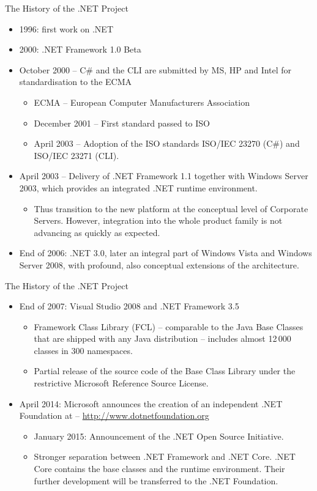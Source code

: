 \documentclass{beamer}
\begin{document}
\begin{frame}{The History of the .NET Project}
\begin{itemize}
\item 1996: first work on .NET
\item 2000: .NET Framework 1.0 Beta
\item October 2000 -- C\# and the CLI are submitted by MS, HP and Intel for
  standardisation to the ECMA
  \begin{itemize}
  \item ECMA -- European Computer Manufacturers Association
  \item December 2001 -- First standard passed to ISO
  \item April 2003 -- Adoption of the ISO standards ISO/IEC 23270 (C\#) and
    ISO/IEC 23271 (CLI).
  \end{itemize}
\item April 2003 -- Delivery of .NET Framework 1.1 together with Windows
  Server 2003, which provides an integrated .NET runtime environment.
  \begin{itemize}
  \item Thus transition to the new platform at the conceptual level of
    Corporate Servers. However, integration into the whole product family is
    not advancing as quickly as expected.
  \end{itemize}
\item End of 2006: .NET 3.0, later an integral part of Windows Vista and
  Windows Server 2008, with profound, also conceptual extensions of the
  architecture.
\end{itemize}
\end{frame}

\begin{frame}{The History of the .NET Project}
\begin{itemize}
\item End of 2007: Visual Studio 2008 and .NET Framework 3.5
  \begin{itemize}
  \item Framework Class Library (FCL) -- comparable to the Java Base Classes
    that are shipped with any Java distribution -- includes almost 12\,000
    classes in 300 namespaces.
  \item Partial release of the source code of the Base Class Library under the
    restrictive Microsoft Reference Source License.
  \end{itemize}
\item April 2014: Microsoft announces the creation of an independent .NET
  Foundation at -- \url{http://www.dotnetfoundation.org}
  \begin{itemize}
  \item January 2015: Announcement of the .NET Open Source Initiative.
  \item Stronger separation between .NET Framework and .NET Core. .NET Core
    contains the base classes and the runtime environment. Their further
    development will be transferred to the .NET Foundation.
  \end{itemize}
\end{itemize}
\end{frame}
\end{document}
